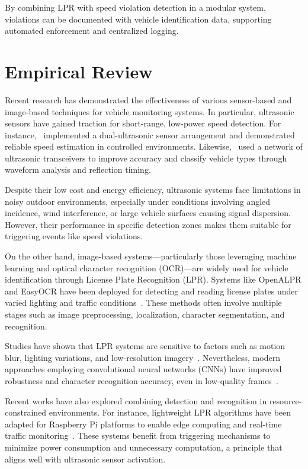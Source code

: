 By combining LPR with speed violation detection in a modular system, violations can be documented with vehicle identification data, supporting automated enforcement and centralized logging.


\section{Empirical Review}

Recent research has demonstrated the effectiveness of various sensor-based and image-based techniques for vehicle monitoring systems. In particular, ultrasonic sensors have gained traction for short-range, low-power speed detection. For instance,~\cite{ultrasonic_researchgate} implemented a dual-ultrasonic sensor arrangement and demonstrated reliable speed estimation in controlled environments. Likewise,~\cite{ultrasonic_ieee_paper} used a network of ultrasonic transceivers to improve accuracy and classify vehicle types through waveform analysis and reflection timing.

Despite their low cost and energy efficiency, ultrasonic systems face limitations in noisy outdoor environments, especially under conditions involving angled incidence, wind interference, or large vehicle surfaces causing signal dispersion. However, their performance in specific detection zones makes them suitable for triggering events like speed violations.

On the other hand, image-based systems—particularly those leveraging machine learning and optical character recognition (OCR)—are widely used for vehicle identification through License Plate Recognition (LPR). Systems like OpenALPR and EasyOCR have been deployed for detecting and reading license plates under varied lighting and traffic conditions~\cite{lpr_survey, easyocr_github}. These methods often involve multiple stages such as image preprocessing, localization, character segmentation, and recognition.

Studies have shown that LPR systems are sensitive to factors such as motion blur, lighting variations, and low-resolution imagery~\cite{lpr_challenges_paper}. Nevertheless, modern approaches employing convolutional neural networks (CNNs) have improved robustness and character recognition accuracy, even in low-quality frames~\cite{cnn_lpr_improvement}.

Recent works have also explored combining detection and recognition in resource-constrained environments. For instance, lightweight LPR algorithms have been adapted for Raspberry Pi platforms to enable edge computing and real-time traffic monitoring~\cite{raspi_lpr_edge}. These systems benefit from triggering mechanisms to minimize power consumption and unnecessary computation, a principle that aligns well with ultrasonic sensor activation.

